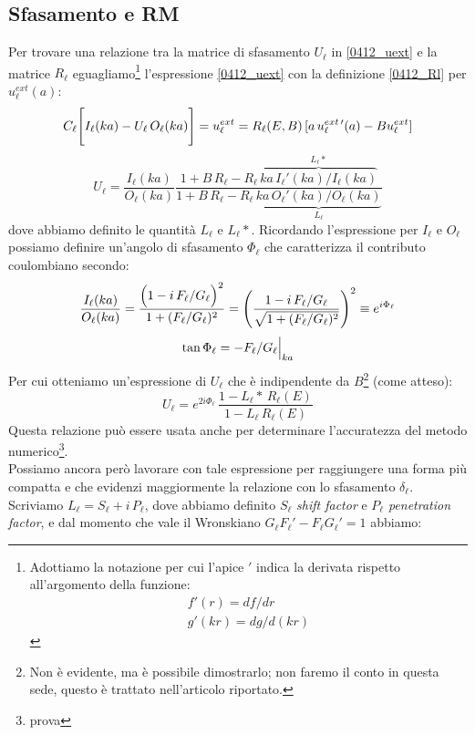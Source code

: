 \subsection{Sfasamento e RM}
Per trovare una relazione tra la matrice di sfasamento $U_\ell$ in \eqref{0412_uext} e la matrice $R_\ell$ eguagliamo\footnote{Adottiamo la notazione per cui l'apice $'$ indica la derivata rispetto all'argomento della funzione:%
\begin{displaymath}%
\begin{array}{l}
	f'(r) = df/dr \\
	g'(kr) = dg/d(kr)
\end{array}
\end{displaymath}%
} l'espressione \eqref{0412_uext} con la definizione \eqref{0412_Rl} per $u^{ext}_\ell (a)$:
$$ C_\ell \Biggl [ I_\ell(ka) - U_\ell \, O_\ell(ka) \Biggr ] = u_\ell^{ext} = R_\ell(E,B) \,[a \, u_\ell^{ext\,\prime}  (a) - B u_\ell^{ext}] $$
$$U_\ell = \frac{I_\ell(ka)}{O_\ell(ka)} \frac{1+B\, R_\ell -R_\ell \, \overbrace{ka \, I_\ell ' (ka)/I_\ell (ka)}^{L_\ell *}}{1+B\, R_\ell - R_\ell \, \underbrace{ka \,  O_\ell ' (ka)/O_\ell (ka)}_{L_\ell}}$$
dove abbiamo definito le quantità $L_\ell$ e $L_\ell *$. Ricordando l'espressione per $I_\ell$ e $O_\ell$ possiamo definire un'angolo di sfasamento $\Phi_\ell$ che caratterizza il contributo coulombiano secondo:
$$\frac{I_\ell (ka)}{O_\ell (ka)} = \frac{\Bigl ( 1-i \, F_\ell/G_\ell \Bigr )^2}{1 + (F_\ell/G_\ell)^2} = \Biggl ( \frac{1-i\, F_\ell/G_\ell}{\sqrt{1 + (F_\ell/G_\ell)^2}} \Biggr )^2 \equiv e^{i\Phi_\ell}$$
$$\tan{\Phi_\ell} = - F_\ell / G_\ell\Bigl |_{ka}$$
Per cui otteniamo un'espressione di $U_\ell$ che è indipendente da $B$\footnote{Non è evidente, ma è possibile dimostrarlo; non faremo il conto in questa sede, questo è trattato nell'articolo riportato.} (come atteso): 
$$U_\ell = e^{2i\Phi_\ell} \, \frac{1-L_\ell * \, R_\ell (E)}{1-L_\ell  \, R_\ell (E)}$$
Questa relazione può essere usata anche per determinare l'accuratezza del metodo numerico\footnote{\label{0412_art2} prova}. 
\\
Possiamo ancora però lavorare con tale espressione per raggiungere una forma più compatta e che evidenzi maggiormente la relazione con lo sfasamento $\delta_\ell$. Scriviamo $L_\ell = S_\ell + i \, P_\ell$, dove abbiamo definito $S_\ell$ \textit{shift factor} e $P_\ell$ \textit{penetration factor}, e dal momento che vale il Wronskiano $G_\ell F_\ell ' - F_\ell G_\ell ' = 1$ abbiamo:
